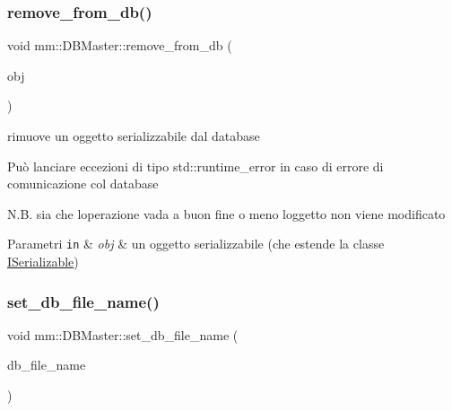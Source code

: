 \mbox{\label{classmm_1_1_d_b_master_a4d5d51bf4b3437294a52fcd3747520d3}} 
\subsubsection{\texorpdfstring{remove\+\_\+from\+\_\+db()}{remove\_from\_db()}}
{\footnotesize\ttfamily void mm\+::\+D\+B\+Master\+::remove\+\_\+from\+\_\+db (\begin{DoxyParamCaption}\item[{const \hyperlink{classmm_1_1_i_serializable}{I\+Serializable} \&}]{obj }\end{DoxyParamCaption})}



rimuove un oggetto serializzabile dal database 

Può lanciare eccezioni di tipo std\+::runtime\+\_\+error in caso di errore di comunicazione col database

N.\+B. sia che l\textquotesingle{}operazione vada a buon fine o meno l\textquotesingle{}oggetto non viene modificato


\begin{DoxyParams}[1]{Parametri}
\mbox{\tt in}  & {\em obj} & un oggetto serializzabile (che estende la classe \hyperlink{classmm_1_1_i_serializable}{I\+Serializable}) \\
\hline
\end{DoxyParams}
\mbox{\label{classmm_1_1_d_b_master_a3346d25779e18ed7ad70eed0d89347e9}} 
\subsubsection{\texorpdfstring{set\+\_\+db\+\_\+file\+\_\+name()}{set\_db\_file\_name()}}
{\footnotesize\ttfamily void mm\+::\+D\+B\+Master\+::set\+\_\+db\+\_\+file\+\_\+name (\begin{DoxyParamCaption}\item[{const string \&}]{db\+\_\+file\+\_\+name }\end{DoxyParamCaption})\hspace{0.3cm}{\ttfamily [static]}}



